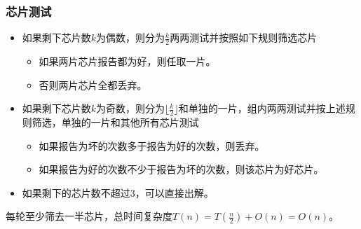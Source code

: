 \documentclass{ctexbeamer}
\begin{document}
    \begin{frame}
        \frametitle{芯片测试}

        \begin{itemize}
            \item 如果剩下芯片数$k$为偶数，则分为$\frac{k}{2}$两两测试并按照如下规则筛选芯片
                \begin{itemize}
                    \item 如果两片芯片报告都为好，则任取一片。
                    \item 否则两片芯片全都丢弃。
                \end{itemize}
            \item 如果剩下芯片数$k$为奇数，则分为$\lfloor \frac{k}{2} \rfloor$和单独的一片，组内两两测试并按上述规则筛选，单独的一片和其他所有芯片测试
                \begin{itemize}
                    \item 如果报告为坏的次数多于报告为好的次数，则丢弃。
                    \item 如果报告为好的次数不少于报告为坏的次数，则该芯片为好芯片。
                \end{itemize}
            \item 如果剩下的芯片数不超过$3$，可以直接出解。
        \end{itemize}

        每轮至少筛去一半芯片，总时间复杂度$T(n) = T(\frac{n}{2}) + O(n) = O(n)$。

    \end{frame}




    
\end{document}
